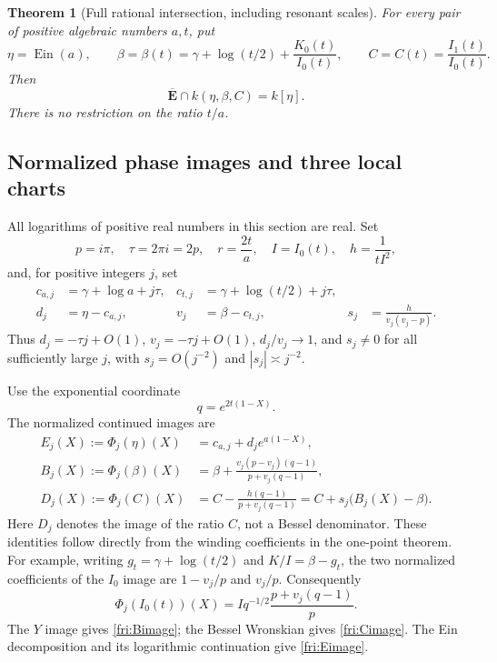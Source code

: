 \documentclass[11pt]{article}
\newtheorem{theorem}{Theorem}[section]
\theoremstyle{definition}
\theoremstyle{remark}
\newcommand{\Ein}{\operatorname{Ein}}
\begin{document}
\begin{theorem}[Full rational intersection, including resonant scales]
\label{fri:main}
For every pair of positive algebraic numbers $a,t$, put
\[
 \eta=\Ein(a),\qquad
 \beta=\beta(t)=\gamma+\log(t/2)+\frac{K_0(t)}{I_0(t)},
 \qquad C=C(t)=\frac{I_1(t)}{I_0(t)}.
\]
Then
\begin{equation}\label{fri:main-equation}
 \boxed{\quad
 \overline{\mathbf E}\cap k(\eta,\beta,C)=k[\eta].
 \quad}
\end{equation}
There is no restriction on the ratio $t/a$.
\end{theorem}

\subsection{Normalized phase images and three local charts}

All logarithms of positive real numbers in this section are real.
Set
\[
 p=i\pi,\quad \tau=2\pi i=2p,\quad r=\frac{2t}{a},
 \quad I=I_0(t),\quad h=\frac1{tI^2},
\]
and, for positive integers $j$, set
\begin{align*}
 c_{a,j}&=\gamma+\log a+j\tau,&
 c_{t,j}&=\gamma+\log(t/2)+j\tau,\\
 d_j&=\eta-c_{a,j},&v_j&=\beta-c_{t,j},&
 s_j&=\frac{h}{v_j(v_j-p)}.
\end{align*}
Thus $d_j=-\tau j+O(1)$, $v_j=-\tau j+O(1)$,
$d_j/v_j\to1$, and $s_j\ne0$ for all sufficiently large $j$, with
$s_j=O(j^{-2})$ and $|s_j|\asymp j^{-2}$.

Use the exponential coordinate
\[
 q=e^{2t(1-X)}.
\]
The normalized continued images are
\begin{align}
 E_j(X):=\Phi_j(\eta)(X)
   &=c_{a,j}+d_j e^{a(1-X)},\label{fri:Eimage}\\
 B_j(X):=\Phi_j(\beta)(X)
   &=\beta+
     \frac{v_j(p-v_j)(q-1)}{p+v_j(q-1)},\label{fri:Bimage}\\
 D_j(X):=\Phi_j(C)(X)
   &=C-\frac{h(q-1)}{p+v_j(q-1)}
     =C+s_j\bigl(B_j(X)-\beta\bigr).
     \label{fri:Cimage}
\end{align}
Here $D_j$ denotes the image of the ratio $C$, not a Bessel
denominator.  These identities follow directly from the winding
coefficients in the one-point theorem.  For example, writing
$g_t=\gamma+\log(t/2)$ and $K/I=\beta-g_t$, the two normalized
coefficients of the $I_0$ image are $1-v_j/p$ and $v_j/p$.
Consequently
\[
 \Phi_j(I_0(t))(X)
 =I q^{-1/2}\frac{p+v_j(q-1)}p.
\]
The $Y$ image gives \eqref{fri:Bimage}; the Bessel Wronskian gives
\eqref{fri:Cimage}.  The Ein decomposition and its logarithmic
continuation give \eqref{fri:Eimage}.
\end{document}
